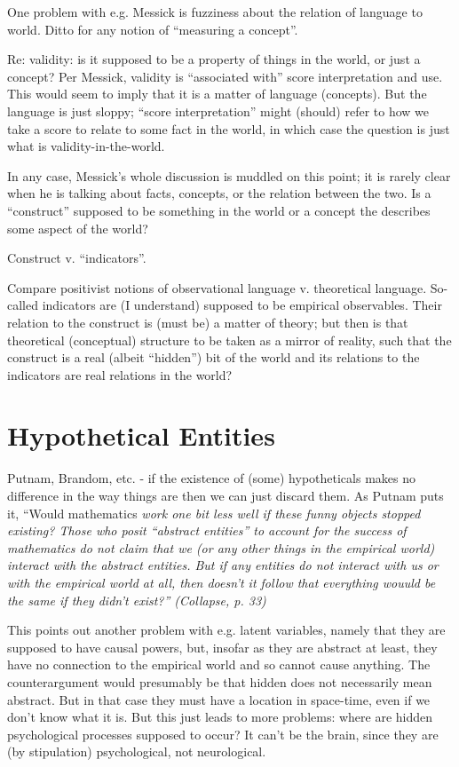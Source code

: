 \documentclass[11pt,twoside]{article}
\begin{document}
One problem with e.g. Messick is fuzziness about the relation of
language to world.  Ditto for any notion of ``measuring a concept''.

Re: validity: is it supposed to be a property of things in the world,
or just a concept?  Per Messick, validity is ``associated with'' score
interpretation and use.  This would seem to imply that it is a matter
of language (concepts).  But the language is just sloppy; ``score
interpretation'' might (should) refer to how we take a score to relate
to some fact in the world, in which case the question is just what is
validity-in-the-world.

In any case, Messick's whole discussion is muddled on this point; it
is rarely clear when he is talking about facts, concepts, or the
relation between the two.  Is a ``construct'' supposed to be something
in the world or a concept the describes some aspect of the world?

Construct v. ``indicators''.

Compare positivist notions of observational language v. theoretical
language.  So-called indicators are (I understand) supposed to be
empirical observables.  Their relation to the construct is (must be) a
matter of theory; but then is that theoretical (conceptual) structure
to be taken as a mirror of reality, such that the construct is a real
(albeit ``hidden'') bit of the world and its relations to the
indicators are real relations in the world?

\section{Hypothetical Entities}

Putnam, Brandom, etc. - if the existence of (some) hypotheticals makes
no difference in the way things are then we can just discard them.  As
Putnam puts it, ``Would mathematics \it{work} one bit less well if
these funny objects \it{stopped} existing?  Those who posit ``abstract
entities''  to account for the success of mathematics do not claim that we (or any other things in the empirical world) \it{interact} with the abstract entities.  But if any entities do not interact with us or with the empirical world \it{at all}, then doesn't it follow that \it{everything wouuld be the same if they didn't exist}?'' (Collapse, p. 33)

This points out another problem with e.g. latent variables, namely
that they are supposed to have causal powers, but, insofar as they are
abstract at least, they have no connection to the empirical world and
so cannot cause anything.  The counterargument would presumably be
that hidden does not necessarily mean abstract.  But in that case they
must have a location in space-time, even if we don't know what it is.
But this just leads to more problems: where are hidden psychological
processes supposed to occur?  It can't be the brain, since they are
(by stipulation) psychological, not neurological.
\end{document}
